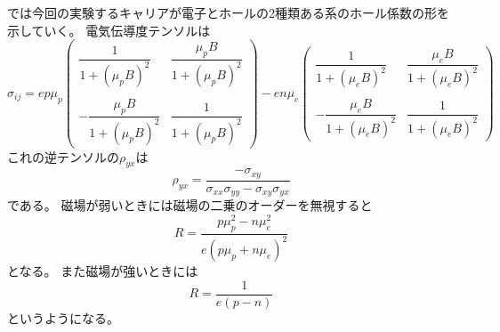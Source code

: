 \documentclass[11pt,dvipdfmx,a4paper]{jsarticle}
\numberwithin{equation}{section}
\begin{document}
では今回の実験するキャリアが電子とホールの2種類ある系のホール係数の形を示していく。
電気伝導度テンソルは
\begin{equation}
	\sigma_{ij} =
	ep\mu_p
	\begin{pmatrix}
		\dfrac{1}{1+(\mu_p B)^2} & \dfrac{\mu_p B}{1+(\mu_p B)^2}\\
		&\\
		-\dfrac{\mu_p B}{1+(\mu_p B)^2} & \dfrac{1}{1+(\mu_p B)^2}
	\end{pmatrix}
	-
	en\mu_e
	\begin{pmatrix}
		\dfrac{1}{1+(\mu_e B)^2} & \dfrac{\mu_e B}{1+(\mu_e B)^2}\\
		&\\
		-\dfrac{\mu_e B}{1+(\mu_e B)^2} & \dfrac{1}{1+(\mu_e B)^2}
	\end{pmatrix}
\end{equation}
これの逆テンソルの\(\rho_{yx}\)は
\begin{equation}
	\rho_{yx} = \frac{-\sigma_{xy}}{\sigma_{xx}\sigma_{yy}-\sigma_{xy}\sigma_{yx}}
\end{equation}
である。
磁場が弱いときには磁場の二乗のオーダーを無視すると
\begin{equation}
	R = \frac{p\mu_p^2 - n\mu_e^2}{e(p\mu_p+n\mu_e)^2}
\end{equation}
となる。
また磁場が強いときには
\begin{equation}
	R = \frac{1}{e(p-n)}
\end{equation}
というようになる。 %

\clearpage
\end{document}

